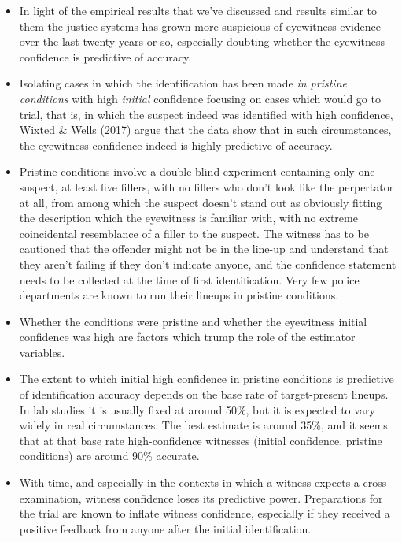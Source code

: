 \documentclass[10pt,dvipsnames,enabledeprecatedfontcommands]{scrartcl}
\begin{document}
\begin{itemize}
\item
  In light of the empirical results that we've discussed and results
  similar to them the justice systems has grown more suspicious of
  eyewitness evidence over the last twenty years or so, especially
  doubting whether the eyewitness confidence is predictive of accuracy.
\item
  Isolating cases in which the identification has been made
  \emph{in pristine conditions} with high \emph{initial} confidence
  focusing on cases which would go to trial, that is, in which the
  suspect indeed was identified with high confidence, Wixted \& Wells
  (2017) argue that the data show that in such circumstances, the
  eyewitness confidence indeed is highly predictive of accuracy.
\item
  Pristine conditions involve a double-blind experiment containing only
  one suspect, at least five fillers, with no fillers who don't look
  like the perpertator at all, from among which the suspect doesn't
  stand out as obviously fitting the description which the eyewitness is
  familiar with, with no extreme coincidental resemblance of a filler to
  the suspect. The witness has to be cautioned that the offender might
  not be in the line-up and understand that they aren't failing if they
  don't indicate anyone, and the confidence statement needs to be
  collected at the time of first identification. Very few police
  departments are known to run their lineups in pristine conditions.
\item
  Whether the conditions were pristine and whether the eyewitness
  initial confidence was high are factors which trump the role of the
  estimator variables.
\item
  The extent to which initial high confidence in pristine conditions is
  predictive of identification accuracy depends on the base rate of
  target-present lineups. In lab studies it is usually fixed at around
  50\%, but it is expected to vary widely in real circumstances. The
  best estimate is around 35\%, and it seems that at that base rate
  high-confidence witnesses (initial confidence, pristine conditions)
  are around 90\% accurate.
\item
  With time, and especially in the contexts in which a witness expects a
  cross-examination, witness confidence loses its predictive power.
  Preparations for the trial are known to inflate witness confidence,
  especially if they received a positive feedback from anyone after the
  initial identification.
\end{itemize}
\end{document}
